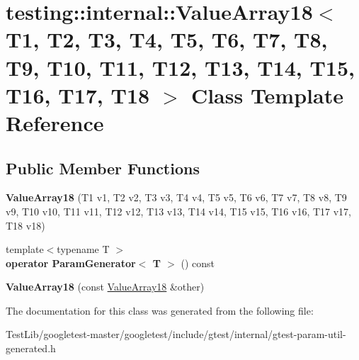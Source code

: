 \hypertarget{classtesting_1_1internal_1_1ValueArray18}{}\section{testing\+:\+:internal\+:\+:Value\+Array18$<$ T1, T2, T3, T4, T5, T6, T7, T8, T9, T10, T11, T12, T13, T14, T15, T16, T17, T18 $>$ Class Template Reference}
\label{classtesting_1_1internal_1_1ValueArray18}
\subsection*{Public Member Functions}
\begin{DoxyCompactItemize}
\item 
\mbox{\label{classtesting_1_1internal_1_1ValueArray18_adf8554745ebde65aba76a7bc6c1a5a06}} 
{\bfseries Value\+Array18} (T1 v1, T2 v2, T3 v3, T4 v4, T5 v5, T6 v6, T7 v7, T8 v8, T9 v9, T10 v10, T11 v11, T12 v12, T13 v13, T14 v14, T15 v15, T16 v16, T17 v17, T18 v18)
\item 
\mbox{\label{classtesting_1_1internal_1_1ValueArray18_a403e37450f8f4b21d38890d172ec57c0}} 
{\footnotesize template$<$typename T $>$ }\\{\bfseries operator Param\+Generator$<$ T $>$} () const
\item 
\mbox{\label{classtesting_1_1internal_1_1ValueArray18_a09150c1d1ee21f7bec61f673b2b8cae0}} 
{\bfseries Value\+Array18} (const \hyperlink{classtesting_1_1internal_1_1ValueArray18}{Value\+Array18} \&other)
\end{DoxyCompactItemize}


The documentation for this class was generated from the following file\+:\begin{DoxyCompactItemize}
\item 
Test\+Lib/googletest-\/master/googletest/include/gtest/internal/gtest-\/param-\/util-\/generated.\+h\end{DoxyCompactItemize}
